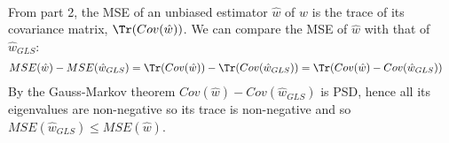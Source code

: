 \begin{Parts}
\\
\begin{solution}
From part 2, the MSE of an unbiased estimator $\hat{w}$ of $w$ is the trace of its covariance matrix, $\Tr(Cov(\hat{w}))$. We can compare the MSE of $\hat{w}$ with that of $\hat{w}_{GLS}$:
\begin{align*}
MSE(\hat{w})-MSE(\hat{w}_{GLS})&=\Tr(Cov(\hat{w}))-\Tr(Cov(\hat{w}_{GLS}))=\Tr(Cov(\hat{w})-Cov(\hat{w}_{GLS}))
\end{align*}
By the Gauss-Markov theorem $Cov(\hat{w})-Cov(\hat{w}_{GLS})$ is PSD, hence all its eigenvalues are non-negative so its trace is non-negative and so $MSE(\hat{w}_{GLS})\leq MSE(\hat{w})$.
\end{solution}
\end{Parts}

\newpage

